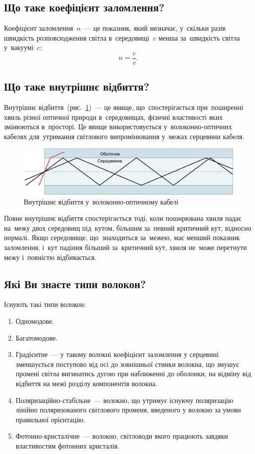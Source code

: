 \documentclass[
	a4paper,
	oneside,
	BCOR = 10mm,
	DIV = 12,
	12pt,
	headings = normal,
]{scrartcl}
\begin{document}
		\subsection{Що таке коефіцієнт заломлення?}
			Коефіцієнт заломлення~$n$~— це показник, який визначає, у~скільки разів швидкість розповсюдження світла в~середовищі~$v$ менша за~швидкість світла у~вакуумі~$c$:
			\[
				n = \frac{c}{v}.
			\]

		\subsection{Що таке внутрішнє відбиття?}
			Внутрішнє відбиття~(рис.~\ref{fig:internal-reflection-fiber-optical-cable})~— це явище, що~спостерігається при~поширенні хвиль різної оптичної природи в~середовищах, фізичні властивості яких змінюються в~просторі. Це явище використовується у~волоконно-оптичних кабелях для~утримання світлового випромінювання у~межах серцевини кабеля.

			\begin{figure}[!htbp]
				\centering
				\includegraphics[height = 4\baselineskip]{./assets/total-internal-reflection.jpg}
				\caption{Внутрішнє відбиття у~волоконно-оптичному кабелі}
				\label{fig:internal-reflection-fiber-optical-cable}
			\end{figure}

			Повне внутрішнє відбиття спостерігається тоді, коли поширювана хвиля падає на~межу двох середовищ під~кутом, більшим за~певний критичний кут, відносно нормалі. Якщо середовище, що~знаходиться за~межею, має менший показник заломлення, і~кут падіння більший за~критичний кут, хвиля не~може перетнути межу і~повністю відбивається.

		\subsection{Які Ви знаєте типи волокон?}
			Існують такі типи волокон:
			\begin{enumerate}[noitemsep]
				\item Одномодове.
				\item Багатомодове.
				\item Градієнтне~— у такому волокні коефіцієнт заломлення у серцевині зменшується поступово від осі до зовнішньої стинки волокна, що змушує промені світла вигинатись дугою при наближенні до оболонки, на відміну від відбиття на межі розділу компонентів волокна.
				\item Поляризаційно-стабільне~— волокно, що утримує існуючу поляризацію лінійно поляризованого світлового променя, введеного у волокно за умови правильної орієнтацію.
				\item Фотонно-кристалічне~— волокно, світловоди якого працюють завдяки властивостям фотонних кристалів.
			\end{enumerate}
\end{document}
